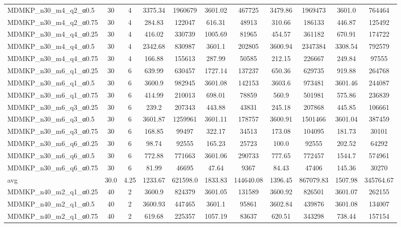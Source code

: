 \begin{table}[!ht]
\begin{tabular}{lcccccccccc}
MDMKP\_n30\_m4\_q2\_α0.5 & 30 & 4 & 3375.34 & 1960679 & 3601.02 & 467725 & 3479.86 & 1969473 & 3601.0 & 764464 \\
MDMKP\_n30\_m4\_q2\_α0.75 & 30 & 4 & 284.83 & 122047 & 616.31 & 48913 & 310.66 & 186133 & 446.87 & 125492 \\
MDMKP\_n30\_m4\_q4\_α0.25 & 30 & 4 & 416.02 & 330739 & 1005.69 & 81965 & 454.57 & 361182 & 670.91 & 174722 \\
MDMKP\_n30\_m4\_q4\_α0.5 & 30 & 4 & 2342.68 & 830987 & 3601.1 & 202805 & 3600.94 & 2347384 & 3308.54 & 792579 \\
MDMKP\_n30\_m4\_q4\_α0.75 & 30 & 4 & 166.88 & 155613 & 287.99 & 50585 & 212.15 & 226667 & 249.84 & 97555 \\
MDMKP\_n30\_m6\_q1\_α0.25 & 30 & 6 & 639.99 & 630457 & 1727.14 & 137237 & 650.36 & 629735 & 919.88 & 264768 \\
MDMKP\_n30\_m6\_q1\_α0.5 & 30 & 6 & 3600.9 & 982945 & 3601.08 & 142153 & 3603.6 & 973481 & 3601.46 & 244087 \\
MDMKP\_n30\_m6\_q1\_α0.75 & 30 & 6 & 414.99 & 210013 & 698.01 & 78859 & 560.9 & 501981 & 575.86 & 236839 \\
MDMKP\_n30\_m6\_q3\_α0.25 & 30 & 6 & 239.2 & 207343 & 443.88 & 43831 & 245.18 & 207868 & 445.85 & 106661 \\
MDMKP\_n30\_m6\_q3\_α0.5 & 30 & 6 & 3601.87 & 1259961 & 3601.11 & 178757 & 3600.91 & 1501466 & 3601.04 & 387459 \\
MDMKP\_n30\_m6\_q3\_α0.75 & 30 & 6 & 168.85 & 99497 & 322.17 & 34513 & 173.08 & 104095 & 181.73 & 30101 \\
MDMKP\_n30\_m6\_q6\_α0.25 & 30 & 6 & 98.74 & 92555 & 165.23 & 25723 & 100.0 & 92555 & 202.52 & 64292 \\
MDMKP\_n30\_m6\_q6\_α0.5 & 30 & 6 & 772.88 & 771663 & 3601.06 & 290733 & 777.65 & 772457 & 1544.7 & 574961 \\
MDMKP\_n30\_m6\_q6\_α0.75 & 30 & 6 & 81.99 & 46695 & 47.64 & 9367 & 84.43 & 47406 & 145.36 & 30270 \\
\hline avg & 30.0 & 4.25 & 1233.67& 621598.0 & 1833.83& 144640.08 & 1396.45& 867079.83 & 1507.98& 345764.67\\ \hline
MDMKP\_n40\_m2\_q1\_α0.25 & 40 & 2 & 3600.9 & 824379 & 3601.05 & 131589 & 3600.92 & 826501 & 3601.07 & 262155 \\
MDMKP\_n40\_m2\_q1\_α0.5 & 40 & 2 & 3600.93 & 447465 & 3601.1 & 95861 & 3602.84 & 439876 & 3601.08 & 134007 \\
MDMKP\_n40\_m2\_q1\_α0.75 & 40 & 2 & 619.68 & 225357 & 1057.19 & 83637 & 620.51 & 343298 & 738.44 & 157154 \\

\end{tabular}
\end{table}
